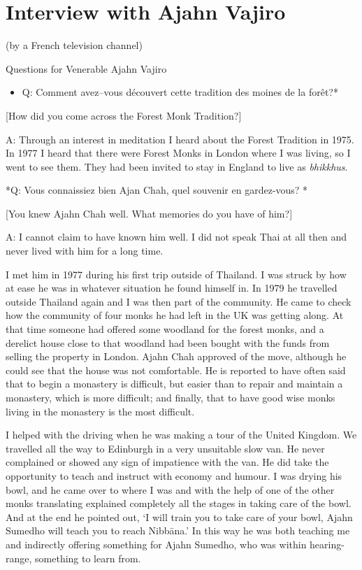 
\chapter{Interview with Ajahn Vajiro}

(by a French television channel)

Questions for Venerable Ajahn Vajiro

\begin{itemize}
\item
  Q: Comment avez--vous découvert cette tradition des moines de la
  forêt?*
\end{itemize}

{[}How did you come across the Forest Monk Tradition?{]}

A: Through an interest in meditation I heard about the Forest Tradition
in 1975. In 1977 I heard that there were Forest Monks in London where I
was living, so I went to see them. They had been invited to stay in
England to live as \emph{bhikkhus}.

*Q: Vous connaissiez bien Ajan Chah, quel souvenir en gardez-vous? *

{[}You knew Ajahn Chah well. What memories do you have of him?{]}

A: I cannot claim to have known him well. I did not speak Thai at all
then and never lived with him for a long time.

I met him in 1977 during his first trip outside of Thailand. I was
struck by how at ease he was in whatever situation he found himself in.
In 1979 he travelled outside Thailand again and I was then part of the
community. He came to check how the community of four monks he had left
in the UK was getting along. At that time someone had offered some
woodland for the forest monks, and a derelict house close to that
woodland had been bought with the funds from selling the property in
London. Ajahn Chah approved of the move, although he could see that the
house was not comfortable. He is reported to have often said that to
begin a monastery is difficult, but easier than to repair and maintain a
monastery, which is more difficult; and finally, that to have good wise
monks living in the monastery is the most difficult.

I helped with the driving when he was making a tour of the United
Kingdom. We travelled all the way to Edinburgh in a very unsuitable slow
van. He never complained or showed any sign of impatience with the van.
He did take the opportunity to teach and instruct with economy and
humour. I was drying his bowl, and he came over to where I was and with
the help of one of the other monks translating explained completely all
the stages in taking care of the bowl. And at the end he pointed out, `I
will train you to take care of your bowl, Ajahn Sumedho will teach you
to reach Nibbāna.' In this way he was both teaching me and indirectly
offering something for Ajahn Sumedho, who was within hearing-range,
something to learn from.

